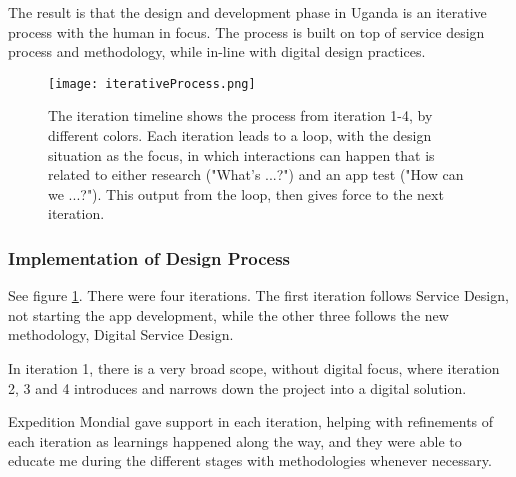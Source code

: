 The result is that the design and development phase in Uganda is an iterative process with the human in focus. The process is built on top of service design process and methodology, while in-line with digital design practices.

\begin{figure}[h]
    \centering
    \texttt{[image: iterativeProcess.png]}
    \caption{The iteration timeline shows the process from iteration 1-4, by different colors. Each iteration leads to a loop, with the design situation as the focus, in which interactions can happen that is related to either research ("What's ...?") and an app test ("How can we ...?"). This output from the loop, then gives force to the next iteration.}
    \label{fig:iterative-process}
\end{figure}


\subsubsection{Implementation of Design Process}
See figure \ref{fig:iterative-process}. There were four iterations. The first iteration follows Service Design, not starting the app development, while the other three follows the new methodology, Digital Service Design.

In iteration 1, there is a very broad scope, without digital focus, where iteration 2, 3 and 4 introduces and narrows down the project into a digital solution.

Expedition Mondial gave support in each iteration, helping with refinements of each iteration as learnings happened along the way, and they were able to educate me during the different stages with methodologies whenever necessary.
